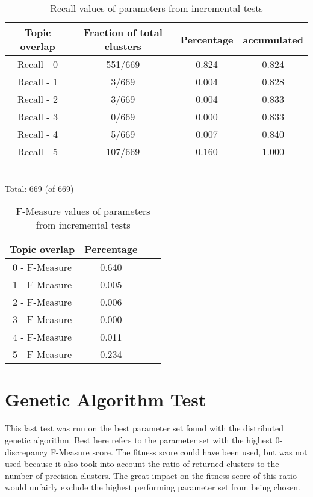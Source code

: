\begin{table}
\begin{center}
\begin{tabular}{|c|c|c|c|}
\hline
Topic overlap &  Fraction of total clusters & Percentage  & accumulated\\ 
\hline
Recall - 0 & 551/669 & 0.824 & 0.824 \\
Recall - 1 & 3/669 & 0.004 & 0.828 \\
Recall - 2 & 3/669 & 0.004 & 0.833\\
Recall - 3 & 0/669 & 0.000 & 0.833\\
Recall - 4 & 5/669 & 0.007 & 0.840\\
Recall - 5 & 107/669 & 0.160 & 1.000\\
\hline
\end{tabular}
\\Total: 669 (of  669)
\end{center}
\caption{Recall values of parameters from incremental tests}
\label{tab:incrementalparametersgroundtruthrep}
\end{table}

\begin{table}
\begin{center}
\begin{tabular}{|c|c|c|c|}
\hline
Topic overlap & Percentage\\ 
\hline
0 - F-Measure & 0.640\\
1 - F-Measure & 0.005\\
2 - F-Measure & 0.006\\
3 - F-Measure & 0.000\\
4 - F-Measure & 0.011\\
5 - F-Measure & 0.234\\
\hline
\end{tabular}
\end{center}
\caption{F-Measure values of parameters from incremental tests}
\label{tab:incrementalparametersfmeasure}
\end{table}

\section{Genetic Algorithm Test}
This last test was run on the best parameter set found with the distributed genetic algorithm. Best here refers to the parameter set with the highest 0-discrepancy F-Measure score. The fitness score could have been used, but was not used because it also took into account the ratio of returned clusters to the number of precision clusters. The great impact on the fitness score of this ratio would unfairly exclude the highest performing parameter set from being chosen.

